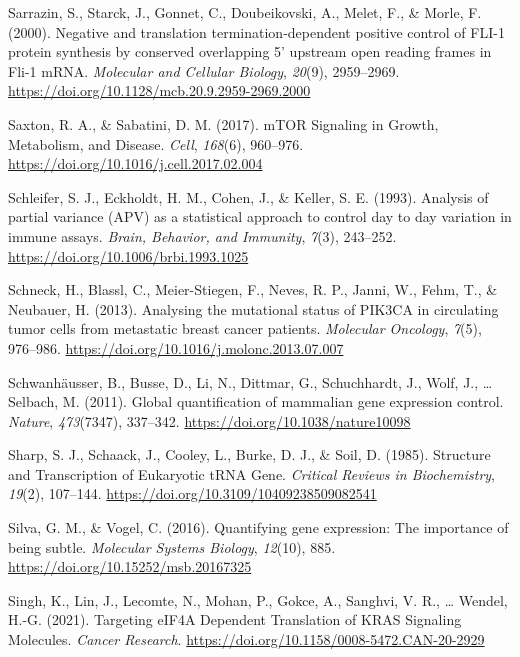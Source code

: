 \documentclass[12pt,openany]{book}
\begin{document}
\hypertarget{ref-Sarrazin2000}{}
Sarrazin, S., Starck, J., Gonnet, C., Doubeikovski, A., Melet, F., \&
Morle, F. (2000). Negative and translation termination-dependent
positive control of FLI-1 protein synthesis by conserved overlapping 5'
upstream open reading frames in Fli-1 mRNA. \emph{Molecular and Cellular
Biology}, \emph{20}(9), 2959--2969.
\url{https://doi.org/10.1128/mcb.20.9.2959-2969.2000}

\hypertarget{ref-Saxton2017}{}
Saxton, R. A., \& Sabatini, D. M. (2017). mTOR Signaling in Growth,
Metabolism, and Disease. \emph{Cell}, \emph{168}(6), 960--976.
\url{https://doi.org/10.1016/j.cell.2017.02.004}

\hypertarget{ref-Schleifer1993}{}
Schleifer, S. J., Eckholdt, H. M., Cohen, J., \& Keller, S. E. (1993).
Analysis of partial variance (APV) as a statistical approach to control
day to day variation in immune assays. \emph{Brain, Behavior, and
Immunity}, \emph{7}(3), 243--252.
\url{https://doi.org/10.1006/brbi.1993.1025}

\hypertarget{ref-Schneck2013}{}
Schneck, H., Blassl, C., Meier-Stiegen, F., Neves, R. P., Janni, W.,
Fehm, T., \& Neubauer, H. (2013). Analysing the mutational status of
PIK3CA in circulating tumor cells from metastatic breast cancer
patients. \emph{Molecular Oncology}, \emph{7}(5), 976--986.
\url{https://doi.org/10.1016/j.molonc.2013.07.007}

\hypertarget{ref-Schwanhausser2011}{}
Schwanhäusser, B., Busse, D., Li, N., Dittmar, G., Schuchhardt, J.,
Wolf, J., \ldots{} Selbach, M. (2011). Global quantification of
mammalian gene expression control. \emph{Nature}, \emph{473}(7347),
337--342. \url{https://doi.org/10.1038/nature10098}

\hypertarget{ref-Sharp1985}{}
Sharp, S. J., Schaack, J., Cooley, L., Burke, D. J., \& Soil, D. (1985).
Structure and Transcription of Eukaryotic tRNA Gene. \emph{Critical
Reviews in Biochemistry}, \emph{19}(2), 107--144.
\url{https://doi.org/10.3109/10409238509082541}

\hypertarget{ref-Silva2016}{}
Silva, G. M., \& Vogel, C. (2016). Quantifying gene expression: The
importance of being subtle. \emph{Molecular Systems Biology},
\emph{12}(10), 885. \url{https://doi.org/10.15252/msb.20167325}

\hypertarget{ref-Singh2021}{}
Singh, K., Lin, J., Lecomte, N., Mohan, P., Gokce, A., Sanghvi, V. R.,
\ldots{} Wendel, H.-G. (2021). Targeting eIF4A Dependent Translation of
KRAS Signaling Molecules. \emph{Cancer Research}.
\url{https://doi.org/10.1158/0008-5472.CAN-20-2929}
\end{document}
